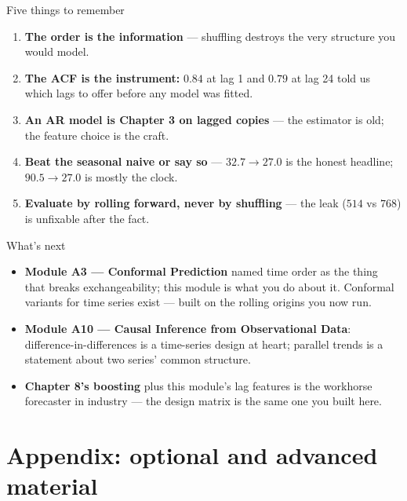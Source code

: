 \documentclass[aspectratio=169,11pt]{beamer}
\begin{document}
\begin{frame}{Five things to remember}
  \begin{takeaway}
    \begin{enumerate}
      \item \textbf{The order is the information} --- shuffling destroys the very
            structure you would model.
      \item \textbf{The ACF is the instrument:} $0.84$ at lag 1 and $0.79$ at lag
            24 told us which lags to offer before any model was fitted.
      \item \textbf{An AR model is Chapter 3 on lagged copies} --- the estimator is
            old; the feature choice is the craft.
      \item \textbf{Beat the seasonal naive or say so} --- $32.7 \to 27.0$ is the
            honest headline; $90.5 \to 27.0$ is mostly the clock.
      \item \textbf{Evaluate by rolling forward, never by shuffling} --- the leak
            ($514$ vs $768$) is unfixable after the fact.
    \end{enumerate}
  \end{takeaway}
\end{frame}

\begin{frame}{What's next}
  \begin{itemize}
    \item \textbf{Module A3 --- Conformal Prediction} named time order as the thing
          that breaks exchangeability; this module is what you do about it.
          Conformal variants for time series exist --- built on the rolling origins
          you now run.
    \item \textbf{Module A10 --- Causal Inference from Observational Data}:
          difference-in-differences is a time-series design at heart; parallel
          trends is a statement about two series' common structure.
    \item \textbf{Chapter 8's boosting} plus this module's lag features is the
          workhorse forecaster in industry --- the design matrix is the same one
          you built here.
  \end{itemize}
\end{frame}

\appendix
\AtBeginSection[]{}
\section{Appendix: optional and advanced material}
\end{document}
